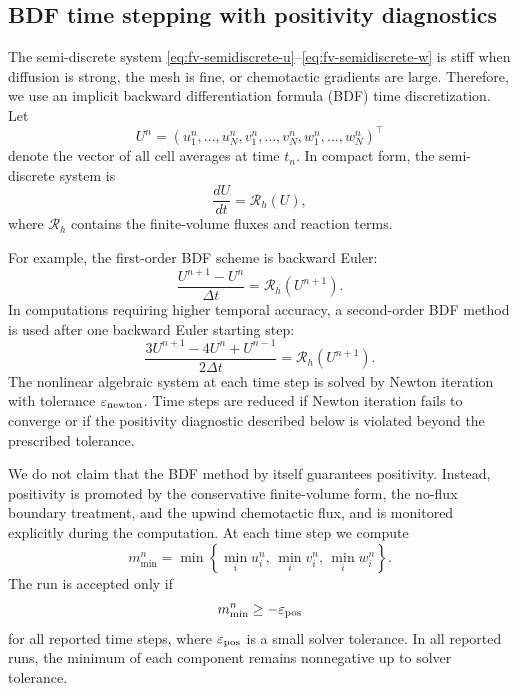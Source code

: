 \documentclass[a4paper,fleqn,longmktitle]{cas-sc}
\theoremstyle{plain}
\theoremstyle{definition}
\numberwithin{equation}{section}
\begin{document}
\subsection{BDF time stepping with positivity diagnostics}
\label{subsec:bdf-time-stepping}

The semi-discrete system
\eqref{eq:fv-semidiscrete-u}--\eqref{eq:fv-semidiscrete-w} is stiff when
diffusion is strong, the mesh is fine, or chemotactic gradients are large.
Therefore, we use an implicit backward differentiation formula (BDF) time
discretization. Let
\[
U^n=(u_1^n,\dots,u_N^n,v_1^n,\dots,v_N^n,w_1^n,\dots,w_N^n)^\top
\]
denote the vector of all cell averages at time \(t_n\). In compact form, the
semi-discrete system is
\[
\frac{dU}{dt}=\mathcal R_h(U),
\]
where \(\mathcal R_h\) contains the finite-volume fluxes and reaction terms.

For example, the first-order BDF scheme is backward Euler:
\begin{equation}\label{eq:backward-euler}
\frac{U^{n+1}-U^n}{\Delta t}
=
\mathcal R_h(U^{n+1}).
\end{equation}
In computations requiring higher temporal accuracy, a second-order BDF method is
used after one backward Euler starting step:
\begin{equation}\label{eq:bdf2}
\frac{3U^{n+1}-4U^n+U^{n-1}}{2\Delta t}
=
\mathcal R_h(U^{n+1}).
\end{equation}
The nonlinear algebraic system at each time step is solved by Newton iteration
with tolerance \(\varepsilon_{\rm newton}\). Time steps are reduced if Newton
iteration fails to converge or if the positivity diagnostic described below is
violated beyond the prescribed tolerance.

We do not claim that the BDF method by itself guarantees positivity. Instead,
positivity is promoted by the conservative finite-volume form, the no-flux
boundary treatment, and the upwind chemotactic flux, and is monitored explicitly
during the computation. At each time step we compute
\begin{equation}\label{eq:positivity-diagnostic}
m_{\min}^{n}
=
\min\left\{
\min_i u_i^n,\,
\min_i v_i^n,\,
\min_i w_i^n
\right\}.
\end{equation}
The run is accepted only if
\begin{equation}\label{eq:positivity-tolerance}
m_{\min}^{n}\ge -\varepsilon_{\rm pos}
\end{equation}
for all reported time steps, where \(\varepsilon_{\rm pos}\) is a small solver
tolerance. In all reported runs, the minimum of each component remains
nonnegative up to solver tolerance.
\end{document}
